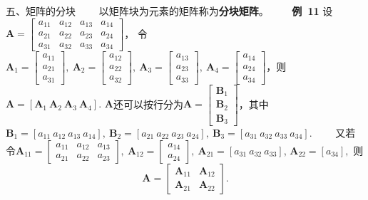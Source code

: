 \documentclass[compress,mathserif,cjk]{beamer}
\theoremstyle{remark}
\numberwithin{equation}{section}
\newcommand{\hei}{\bf}      %
\begin{document}
\begin{CJK}{UTF8}{gbsn}
\begin{frame}{五、矩阵的分块}
\small
 \ \ \ \ 以矩阵块为元素的矩阵称为{\hei 分块矩阵}。
 \pause\vskip 10pt
 \ \ \ \ {\hei 例~11} 设$\bm A=\left[\begin{matrix}a_{11}&a_{12}&a_{13}&a_{14}\\a_{21}&a_{22}&a_{23}&a_{24}\\a_{31}&a_{32}&a_{33}&a_{34}\end{matrix}\right]$，
 令$\bm A_1= \left[\begin{matrix}a_{11}\\a_{21}\\a_{31}\end{matrix}\right],~\bm A_2= \left[\begin{matrix}a_{12}\\a_{22}\\a_{32}\end{matrix}\right],~\bm A_3= \left[\begin{matrix}a_{13}\\a_{23}\\a_{33}\end{matrix}\right],~\bm A_4= \left[\begin{matrix}a_{14}\\a_{24}\\a_{34}\end{matrix}\right]$，则$\bm A=[\bm A_1~\bm A_2~\bm A_3~\bm A_4].$
 \pause\vskip 2pt
 $\bm A$还可以按行分为$\bm A=\left[\begin{matrix}\bm B_1\\\bm B_2\\\bm B_3\end{matrix}\right]$，其中$\bm B_1=[a_{11}~a_{12}~a_{13}~a_{14}],~\bm B_2=[a_{21}~a_{22}~a_{23}~a_{24}],~\bm B_3=[a_{31}~a_{32}~a_{33}~a_{34}].$
 \pause\vskip 5pt
 \ \ \ \ 又若令$\bm A_{11}=\left[\begin{matrix}a_{11}&a_{12}&a_{13}\\a_{21}&a_{22}&a_{23}\end{matrix}\right],~\bm A_{12}=\left[\begin{matrix}a_{14}\\a_{24}\end{matrix}\right],~\bm A_{21}=[a_{31}~a_{32}~a_{33}]$, $\bm A_{22}=[a_{34}],$ 则
 $$\bm A=\left[\begin{matrix}\bm A_{11}&\bm A_{12}\\\bm A_{21}&\bm A_{22}\end{matrix}\right].$$

\end{frame}


\end{CJK}
\end{document}
